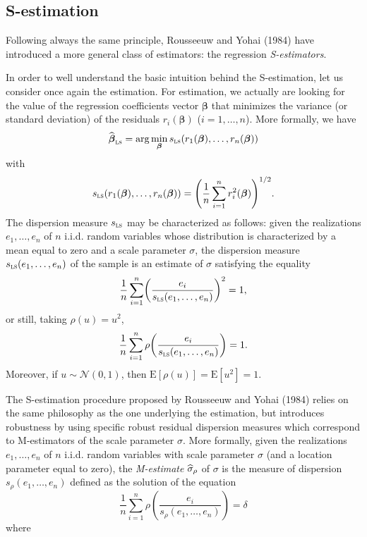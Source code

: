 \subsection{S-estimation}

Following always the same principle, Rousseeuw and Yohai (1984) have
introduced a more general class of estimators: the regression
\emph{S-estimators}.

In order to well understand the basic intuition behind the S-estimation, let
us consider once again the  estimation. For  estimation, we actually are
looking for the value of the regression coefficients vector $\boldsymbol{\beta
}$ that minimizes the variance (or standard deviation) of the residuals
$r_{i}\left(  \boldsymbol\beta\right)  $ ($i = 1, \dots, n$). More formally, we
have
\[
\sthat{\boldsymbol\beta}_{\stsc{LS}}=\arg\min_{\boldsymbol\beta%
}s_{\stsc{LS}}\left(  r_{1}(\boldsymbol\beta),\ldots,r_{n}%
(\boldsymbol\beta)\right)
\]
with%
\[
s_{\stsc{LS}}\left(  r_{1}(\boldsymbol\beta),\ldots,r_{n}%
(\boldsymbol\beta)\right)  =\left(  \frac{1}{n}\sum_{i=1}^{n}r_{i}%
^{2}(\boldsymbol\beta)\right)  ^{1/2}.
\]
The dispersion measure $s_{\stsc{LS}}$ may be characterized as follows:
given the realizations $e_{1},\ldots,e_{n}$ of $n$ i.i.d. random variables
whose distribution is characterized by a mean equal to zero and a scale
parameter $\sigma$, the dispersion measure $s_{\stsc{LS}}\left(
e_{1},\ldots,e_{n}\right)  $ of the sample is an estimate of $\sigma$
satisfying the equality
\[
\frac{1}{n}\sum_{i=1}^{n}\left(  \frac{e_{i}}{s_{\stsc{LS}}\left(
e_{1},\ldots,e_{n}\right)  }\right)  ^{2}=1,
\]
or still, taking $\rho(u)=u^{2}$,
\[
\frac{1}{n}\sum_{i=1}^{n}\rho\left(  \frac{e_{i}}{s_{\stsc{LS}}\left(
e_{1},\ldots,e_{n}\right)  }\right)  =1.
\]
Moreover, if $u\sim\mathcal{N}(0,1)$, then $\mathrm{E}\left[  \rho(u)\right]
=\mathrm{E}\left[  u^{2}\right]  =1$.

The S-estimation procedure proposed by Rousseeuw and Yohai (1984) relies on
the same philosophy as the one underlying the  estimation, but introduces
robustness by using specific robust residual dispersion measures which
correspond to M-estimators of the scale parameter $\sigma$. More formally,
given the realizations $e_{1},\ldots,e_{n}$ of $n$ i.i.d. random variables
with scale parameter $\sigma$ (and a location parameter equal to zero), the
\emph{M-estimate} $\widehat{\sigma}_{\rho}$ of $\sigma$ is the measure of
dispersion $s_{\rho}\left(  e_{1},\ldots,e_{n}\right)  $ defined as the
solution of the equation
\begin{equation}
\frac{1}{n}\sum_{i=1}^{n}\rho\left(  \frac{e_{i}}{s_{\rho}\left(  e_{1}%
,\ldots,e_{n}\right)  }\right)  =\delta\label{eq:M_scale_equation}%
\end{equation}
where

